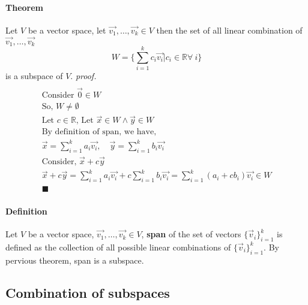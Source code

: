 \documentclass[11pt]{article}
\begin{document}
	\paragraph{Theorem} Let $V$ be a vector space, let $\vec{v_1},\dots,\vec{v_k}\in V$ then the set of all linear combination of $\vec{v_1},\dots,\vec{v_k}$
	\[
	W = \{\sum_{i=1}^k{c_i \vec{v_i}} \vert c_i \in \mathbb{R} \forall \ i\}
	\]
	is a subspace of $V$.
	\newline \emph{proof.}
	\begin{multline*}
		\\
		\text{Consider }\vec{0} \in W \\
		\text{So, } W \neq \emptyset \\
		\text{Let } c \in \mathbb{R} \text{, Let } \vec{x} \in W \land \vec{y} \in W \\
		\text{By definition of span, we have, }\\
		\vec{x} = \sum_{i=1}^k{a_i \vec{v_i}},\quad \vec{y} = \sum_{i=1}^k{b_i \vec{v_i}} \\
		\text{Consider, } \vec{x} + c \vec{y} \\
		\vec{x} + c \vec{y} = \sum_{i=1}^k{a_i \vec{v_i}} + c \sum_{i=1}^k{b_i \vec{v_i}} = \sum_{i=1}^k{(a_i + c b_i) \vec{v_i}} \in W\\
		\blacksquare
	\end{multline*}
	
	\paragraph{Definition} Let $V$ be a vector space, $\vec{v_1},\dots,\vec{v_k} \in V$, \textbf{span} of the set of vectors $\{\vec{v}_i\}_{i=1}^k$ is defined as the collection of all possible linear combinations of $\{\vec{v}_i\}_{i=1}^k$. By pervious theorem, span is a subspace.
	
	\subsection{Combination of subspaces}
\end{document}
